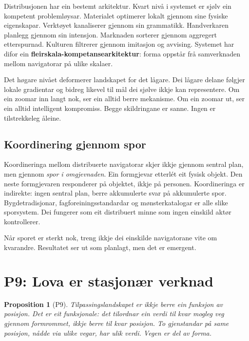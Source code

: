 \documentclass[12pt,a4paper,oneside]{report}
\newtheorem{proposition}[theorem]{Proposition}
\begin{document}
Distribusjonen har ein bestemt arkitektur. Kvart nivå i systemet er sjølv ein kompetent problemløysar. Materialet optimerer lokalt gjennom sine fysiske eigenskapar. Verktøyet kanaliserer gjennom sin grammatikk. Handverkaren planlegg gjennom sin intensjon. Marknaden sorterer gjennom aggregert etterspurnad. Kulturen filtrerer gjennom imitasjon og avvising. Systemet har difor ein \textbf{fleirskala-kompetansearkitektur}: forma oppstår frå samverknaden mellom navigatorar på ulike skalaer.

Det høgare nivået deformerer landskapet for det lågare. Dei lågare delane følgjer lokale gradientar og bidreg likevel til mål dei sjølve ikkje kan representere. Om ein zoomar inn langt nok, ser ein alltid berre mekanisme. Om ein zoomar ut, ser ein alltid intelligent kompromiss. Begge skildringane er sanne. Ingen er tilstrekkeleg åleine.

\subsection{Koordinering gjennom spor}

Koordineringa mellom distribuerte navigatorar skjer ikkje gjennom sentral plan, men gjennom \emph{spor i omgjevnaden}. Ein formgjevar etterlét eit fysisk objekt. Den neste formgjevaren responderer på objektet, ikkje på personen. Koordineringa er indirekte: ingen sentral plan, berre akkumulerte svar på akkumulerte spor. Bygdetradisjonar, fagforeiningsstandardar og mønsterkatalogar er alle slike sporsystem. Dei fungerer som eit distribuert minne som ingen einskild aktør kontrollerer.

Når sporet er sterkt nok, treng ikkje dei einskilde navigatorane vite om kvarandre. Resultatet ser ut som planlagt, men det er emergent.

\section{P9: Lova er stasjonær verknad}
\label{sec:p9}

\begin{proposition}[P9]
Tilpassingslandskapet er ikkje berre ein funksjon av posisjon. Det er eit \emph{funksjonale}: det tilordnar ein verdi til kvar mogleg veg gjennom formrommet, ikkje berre til kvar posisjon. To gjenstandar på same posisjon, nådde via ulike vegar, har ulik verdi. Vegen er del av forma.
\end{proposition}
\end{document}
